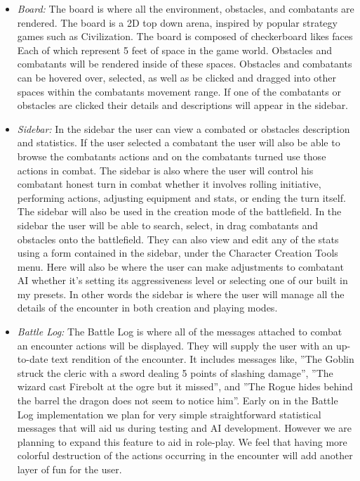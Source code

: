 \documentclass[letterpaper, 10 pt, conference]{ieeeconf}
\begin{document}
\begin{itemize}
	\item \textit{Board:} The board is where all the environment, obstacles, and combatants are rendered.
	The board is a 2D top down arena, inspired by popular strategy games
	such as Civilization. The board is composed of checkerboard likes faces Each of
	which represent 5 feet of space in the game world. Obstacles and combatants will
	be rendered inside of these spaces. Obstacles and combatants can be hovered over,
	selected, as well as be clicked and dragged into other spaces within the combatants
	movement range. If one of the combatants or obstacles are clicked their details
	and descriptions will appear in the sidebar. \\
	\item \textit{Sidebar:} In the sidebar the user can view a combated or obstacles description and statistics.
	If the user selected a combatant the user will also be able to browse the combatants
	actions and on the combatants turned use those actions in combat. The
	sidebar is also where the user will control his combatant honest turn in combat
	whether it involves rolling initiative, performing actions, adjusting equipment and
	stats, or ending the turn itself. The sidebar will also be used in the creation mode
	of the battlefield. In the sidebar the user will be able to search, select, in drag
	combatants and obstacles onto the battlefield. They can also view and edit any
	of the stats using a form contained in the sidebar, under the Character Creation
	Tools menu. Here will also be where the user can make adjustments to combatant
	AI whether it’s setting its aggressiveness level or selecting one of our built in my
	presets. In other words the sidebar is where the user will manage all the details
	of the encounter in both creation and playing modes. \\
	\item \textit{Battle Log:} The Battle Log is where all of the messages attached to combat an
	encounter actions will be displayed. They will supply the user with an up-to-date
	text rendition of the encounter. It includes messages like, ”The Goblin struck
	the cleric with a sword dealing 5 points of slashing damage”, ”The wizard cast
	Firebolt at the ogre but it missed”, and ”The Rogue hides behind the barrel the
	dragon does not seem to notice him”. Early on in the Battle Log implementation
	we plan for very simple straightforward statistical messages that will aid us during
	testing and AI development. However we are planning to expand this feature to
	aid in role-play. We feel that having more colorful destruction of the actions
	occurring in the encounter will add another layer of fun for the user.
\end{itemize}
\end{document}
